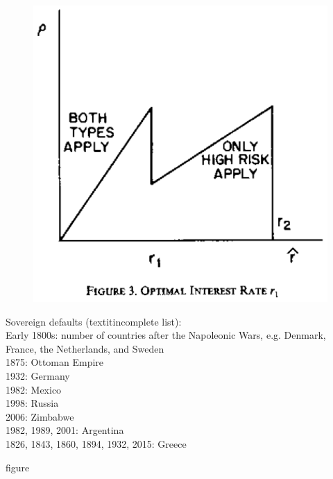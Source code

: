 \documentclass{beamer}
\begin{document}
\begin{frame}
  \begin{figure}
    \includegraphics{stiglitz_weiss3.eps}
  \end{figure}
\end{frame}

\begin{frame}
 Sovereign defaults (textit{incomplete list}):\\
 \medskip
 Early 1800s: number of countries after the Napoleonic Wars, e.g. Denmark, France, the Netherlands, and Sweden\\
 1875: Ottoman Empire\\
 1932: Germany\\
 1982: Mexico\\
 1998: Russia\\
 2006: Zimbabwe\\
 1982, 1989, 2001: Argentina\\
 1826, 1843, 1860, 1894, 1932, 2015: Greece
\end{frame}

\begin{frame}
figure 
\end{frame}
\end{document}
